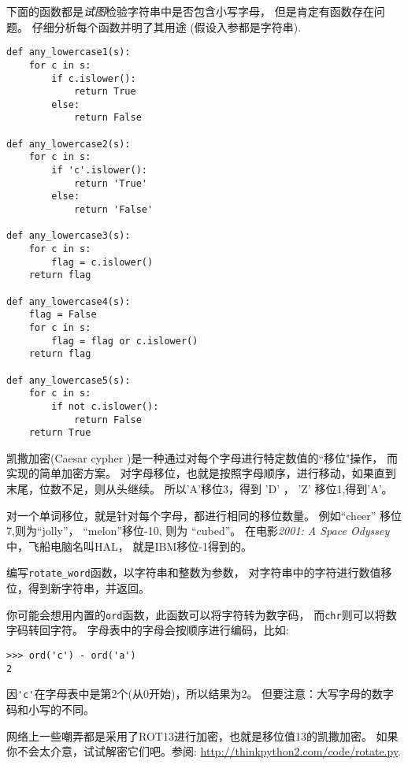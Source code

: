 \documentclass[10pt]{book}
\begin{document}
\begin{exercise}

下面的函数都是{\em 试图}检验字符串中是否包含小写字母，
但是肯定有函数存在问题。
仔细分析每个函数并明了其用途
(假设入参都是字符串).

\begin{verbatim}
def any_lowercase1(s):
    for c in s:
        if c.islower():
            return True
        else:
            return False

def any_lowercase2(s):
    for c in s:
        if 'c'.islower():
            return 'True'
        else:
            return 'False'

def any_lowercase3(s):
    for c in s:
        flag = c.islower()
    return flag

def any_lowercase4(s):
    flag = False
    for c in s:
        flag = flag or c.islower()
    return flag

def any_lowercase5(s):
    for c in s:
        if not c.islower():
            return False
    return True
\end{verbatim}

\end{exercise}


\begin{exercise}

\label{exrotate}
凯撒加密(Caesar cypher )是一种通过对每个字母进行特定数值的``移位"操作，
而实现的简单加密方案。
对字母移位，也就是按照字母顺序，进行移动，如果直到末尾，位数不足，则从头继续。
所以'A'移位3，得到 'D' ，  'Z' 移位1,得到'A'。

对一个单词移位，就是针对每个字母，都进行相同的移位数量。
例如``cheer'' 移位7,则为``jolly''， ``melon''移位-10, 则为 ``cubed''。
在电影{\em 2001: A Space Odyssey}中，飞船电脑名叫HAL，
就是IBM移位-1得到的。


编写\verb"rotate_word"函数，以字符串和整数为参数，
对字符串中的字符进行数值移位，得到新字符串，并返回。

你可能会想用内置的{\tt ord}函数，此函数可以将字符转为数字码，
而{\tt chr}则可以将数字码转回字符。
字母表中的字母会按顺序进行编码，比如:

\begin{verbatim}
>>> ord('c') - ord('a')
2
\end{verbatim}
因\verb"'c'"在字母表中是第2个(从0开始)，所以结果为2。
但要注意：大写字母的数字码和小写的不同。

网络上一些嘲弄都是采用了ROT13进行加密，也就是移位值13的凯撒加密。
如果你不会太介意，试试解密它们吧。参阅:
\url{http://thinkpython2.com/code/rotate.py}.

\end{exercise}
\end{document}
